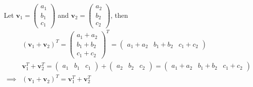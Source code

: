 \documentclass[12pt, letterpaper]{article}
\begin{document}
Let $\mathbf{v}_1 = \begin{pmatrix} a_1\\b_1\\c_1 \end{pmatrix}$ and
$\mathbf{v}_2 = \begin{pmatrix} a_2\\b_2\\c_2 \end{pmatrix}$, then
\begin{equation}\label{5e2}\begin{split}
    &(\mathbf{v}_1 + \mathbf{v}_2)^T = \begin{pmatrix} a_1 + a_2\\b_1 + b_2\\c_1 + c_2 \end{pmatrix}^T
    = \begin{pmatrix} a_1 + a_2&b_1 + b_2&c_1 + c_2 \end{pmatrix}\\
    &\mathbf{v}_1^T + \mathbf{v}_2^T = \begin{pmatrix}a_1&b_1&c_1\end{pmatrix}
      + \begin{pmatrix}a_2&b_2&c_2\end{pmatrix}
      = \begin{pmatrix} a_1 + a_2&b_1 + b_2&c_1 + c_2 \end{pmatrix}\\
    \implies &\boxed{(\mathbf{v}_1 + \mathbf{v}_2)^T = \mathbf{v}_1^T + \mathbf{v}_2^T}
\end{split}\end{equation}\\
\end{document}
